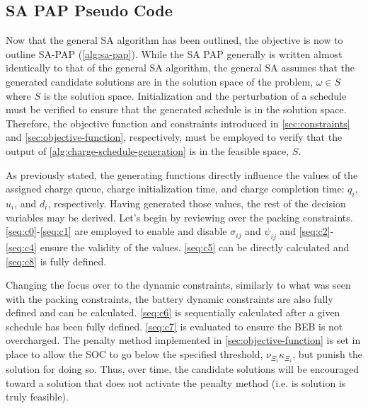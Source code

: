 \documentclass[11pt,a4paper,final]{article}
\begin{document}
\subsection{SA PAP Pseudo Code}
\label{sec:sa-pap-pseudo-code}
Now that the general SA algorithm has been outlined, the objective is now to outline SA-PAP (\ref{alg:sa-pap}). While
the SA PAP generally is written almost identically to that of the general SA algorithm, the general SA assumes that the
generated candidate solutions are in the solution space of the problem, \(\omega \in S\) where \(S\) is the solution space.
Initialization and the perturbation of a schedule must be verified to ensure that the generated schedule is in the
solution space. Therefore, the objective function and constraints introduced in \ref{sec:constraints} and
\ref{sec:objective-function}, respectively, must be employed to verify that the output of
\ref{alg:charge-schedule-generation} is in the feasible space, \(S\).

As previously stated, the generating functions directly influence the values of the assigned charge queue, charge
initialization time, and charge completion time: \(q_i\), \(u_i\), and \(d_i\), respectively. Having generated those values,
the rest of the decision variables may be derived. Let's begin by reviewing over the packing constraints.
\ref{seq:c0}-\ref{seq:c1} are employed to enable and disable \(\sigma_{ij}\) and \(\psi_{ij}\) and \ref{seq:c2}-\ref{seq:c4} ensure
the validity of the values. \ref{seq:c5} can be directly calculated and \ref{seq:c8} is fully defined.

Changing the focus over to the dynamic constraints, similarly to what was seen with the packing constraints, the battery
dynamic constraints are also fully defined and can be calculated. \ref{seq:c6} is sequentially calculated after a given
schedule has been fully defined. \ref{seq:c7} is evaluated to ensure the BEB is not overcharged. The penalty method
implemented in \ref{sec:objective-function} is set in place to allow the SOC to go below the specified threshold, \(\nu_{\Xi_i}
\kappa_{\Xi_i}\), but punish the solution for doing so. Thus, over time, the candidate solutions will be encouraged toward a
solution that does not activate the penalty method (i.e. is solution is truly feasible).
\end{document}
